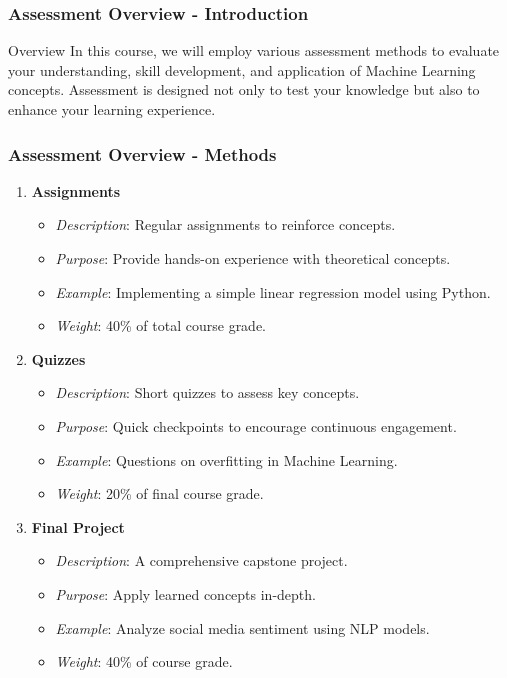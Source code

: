 \documentclass[aspectratio=169]{beamer}
\begin{document}
\begin{frame}[fragile]
    \frametitle{Assessment Overview - Introduction}
    \begin{block}{Overview}
        In this course, we will employ various assessment methods to evaluate your understanding, skill development, and application of Machine Learning concepts. 
        Assessment is designed not only to test your knowledge but also to enhance your learning experience.
    \end{block}
\end{frame}

\begin{frame}[fragile]
    \frametitle{Assessment Overview - Methods}
    \begin{enumerate}
        \item \textbf{Assignments}
            \begin{itemize}
                \item \textit{Description}: Regular assignments to reinforce concepts.
                \item \textit{Purpose}: Provide hands-on experience with theoretical concepts.
                \item \textit{Example}: Implementing a simple linear regression model using Python.
                \item \textit{Weight}: 40\% of total course grade.
            \end{itemize}
        \item \textbf{Quizzes}
            \begin{itemize}
                \item \textit{Description}: Short quizzes to assess key concepts.
                \item \textit{Purpose}: Quick checkpoints to encourage continuous engagement.
                \item \textit{Example}: Questions on overfitting in Machine Learning.
                \item \textit{Weight}: 20\% of final course grade.
            \end{itemize}
        \item \textbf{Final Project}
            \begin{itemize}
                \item \textit{Description}: A comprehensive capstone project.
                \item \textit{Purpose}: Apply learned concepts in-depth.
                \item \textit{Example}: Analyze social media sentiment using NLP models.
                \item \textit{Weight}: 40\% of course grade.
            \end{itemize}
    \end{enumerate}
\end{frame}
\end{document}
